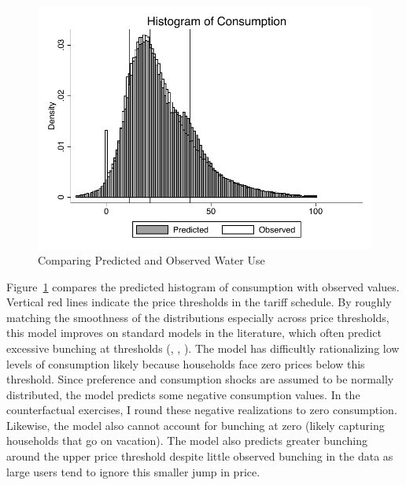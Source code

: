 \documentclass[12pt]{article}
\begin{document}
\begin{figure}
\caption{Comparing Predicted and Observed Water Use}\label{figure:predictedwateruse}
\begin{center}
\includegraphics[scale=.77]{tables/hist_both.pdf}
\end{center}
\end{figure}

Figure~\ref{figure:predictedwateruse} compares the predicted histogram of consumption with observed values.  Vertical red lines indicate the price thresholds in the tariff schedule.  By roughly matching the smoothness of the distributions especially across price thresholds, this model improves on standard models in the literature, which often predict excessive bunching at thresholds (\cite{mcrae2014infrastructure}, \cite{olmstead2009reduced}, \cite{szabo2015value}).  The model has difficultly rationalizing low levels of consumption likely because households face zero prices below this threshold.  Since preference and consumption shocks are assumed to be normally distributed, the model predicts some negative consumption values.  In the counterfactual exercises, I round these negative realizations to zero consumption.  Likewise, the model also cannot account for bunching at zero (likely capturing households that go on vacation).  The model also predicts greater bunching around the upper price threshold despite little observed bunching in the data as large users tend to ignore this smaller jump in price.
\end{document}

